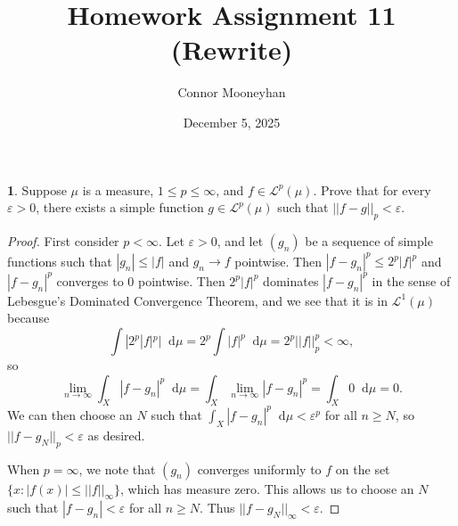 \documentclass[12pt]{article}
\title{Homework Assignment 11 (Rewrite)}
\author{Connor Mooneyhan}
\date{December 5, 2025}
\newcommand{\dd}{\mathop{}\!\mathrm{d}}
\theoremstyle{definition}
\newtheorem{ex}{}
\newenvironment{exercise}[1]{
	\renewcommand{\theex}{#1}
	\begin{ex}
		}{\end{ex}}
\begin{document}
\maketitle

\begin{exercise}{7A.17}
	Suppose $\mu$ is a measure, $1 \leq p \leq \infty$, and $f \in \mathcal{L}^p(\mu)$.
	Prove that for every $\varepsilon > 0$, there exists a simple function $g \in \mathcal{L}^p(\mu)$ such that $||f-g||_p < \varepsilon$.
\end{exercise}
\begin{proof}
	First consider $p < \infty$.
	Let $\varepsilon > 0$, and let $(g_n)$ be a sequence of simple functions such that $|g_n| \leq |f|$ and $g_n \to f$ pointwise.
	Then $|f - g_n|^p \leq 2^p|f|^p$ and $|f-g_n|^p$ converges to 0 pointwise.
	Then $2^p|f|^p$ dominates $|f - g_n|^p$ in the sense of Lebesgue's Dominated Convergence Theorem, and we see that it is in $\mathcal{L}^1(\mu)$ because \begin{equation*}
		\int |2^p|f|^p| \dd\mu = 2^p \int |f|^p \dd \mu = 2^p ||f||_p^p < \infty,
	\end{equation*} so \begin{equation*}
		\lim_{n \to \infty} \int_X |f-g_n|^p \dd\mu = \int_X \lim_{n \to \infty} |f - g_n|^p = \int_X 0\dd\mu = 0.
	\end{equation*}
	We can then choose an $N$ such that $\int_X |f - g_n|^p \dd\mu < \varepsilon^p$ for all $n \geq N$, so $||f-g_N||_p < \varepsilon$ as desired.

	When $p = \infty$, we note that $(g_n)$ converges uniformly to $f$ on the set $\lbrace x : |f(x)| \leq ||f||_\infty \rbrace$, which has measure zero.
	This allows us to choose an $N$ such that $|f - g_n| < \varepsilon$ for all $n \geq N$.
	Thus $||f - g_N||_\infty < \varepsilon$.
\end{proof}
\end{document}
